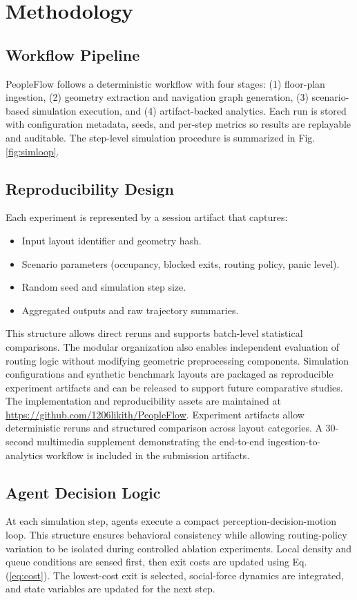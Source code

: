 \documentclass[nolineno]{ieeeaccess}
\begin{document}
\section{Methodology}
\subsection{Workflow Pipeline}
PeopleFlow follows a deterministic workflow with four stages: (1) floor-plan ingestion, (2) geometry extraction and navigation graph generation, (3) scenario-based simulation execution, and (4) artifact-backed analytics. Each run is stored with configuration metadata, seeds, and per-step metrics so results are replayable and auditable. The step-level simulation procedure is summarized in Fig. \ref{fig:simloop}.

\subsection{Reproducibility Design}
Each experiment is represented by a session artifact that captures:
\begin{itemize}
    \item Input layout identifier and geometry hash.
    \item Scenario parameters (occupancy, blocked exits, routing policy, panic level).
    \item Random seed and simulation step size.
    \item Aggregated outputs and raw trajectory summaries.
\end{itemize}
This structure allows direct reruns and supports batch-level statistical comparisons. The modular organization also enables independent evaluation of routing logic without modifying geometric preprocessing components. Simulation configurations and synthetic benchmark layouts are packaged as reproducible experiment artifacts and can be released to support future comparative studies. The implementation and reproducibility assets are maintained at \url{https://github.com/1206likith/PeopleFlow}.
Experiment artifacts allow deterministic reruns and structured comparison across layout categories.
A 30-second multimedia supplement demonstrating the end-to-end ingestion-to-analytics workflow is included in the submission artifacts.

\subsection{Agent Decision Logic}
At each simulation step, agents execute a compact perception-decision-motion loop. This structure ensures behavioral consistency while allowing routing-policy variation to be isolated during controlled ablation experiments. Local density and queue conditions are sensed first, then exit costs are updated using Eq. (\ref{eq:cost}). The lowest-cost exit is selected, social-force dynamics are integrated, and state variables are updated for the next step.
\end{document}
